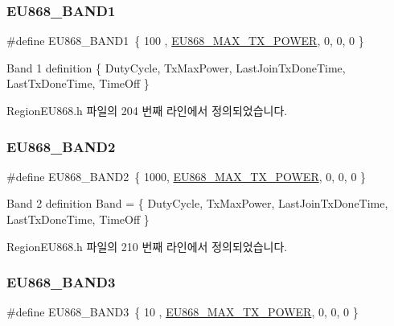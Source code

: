 \mbox{\label{group___r_e_g_i_o_n_e_u868_ga8a18e253f46e534ff0ee00c0c21b4211}} 
\subsubsection{\texorpdfstring{E\+U868\+\_\+\+B\+A\+N\+D1}{EU868\_BAND1}}
{\footnotesize\ttfamily \#define E\+U868\+\_\+\+B\+A\+N\+D1~\{ 100 , \mbox{\hyperlink{group___r_e_g_i_o_n_e_u868_ga39e338c7f8454f594302811f61d9560d}{E\+U868\+\_\+\+M\+A\+X\+\_\+\+T\+X\+\_\+\+P\+O\+W\+ER}}, 0, 0, 0 \}}

Band 1 definition \{ Duty\+Cycle, Tx\+Max\+Power, Last\+Join\+Tx\+Done\+Time, Last\+Tx\+Done\+Time, Time\+Off \} 

Region\+E\+U868.\+h 파일의 204 번째 라인에서 정의되었습니다.

\mbox{\label{group___r_e_g_i_o_n_e_u868_gaf5b8aba834ede7487acbff80b6c30b36}} 
\subsubsection{\texorpdfstring{E\+U868\+\_\+\+B\+A\+N\+D2}{EU868\_BAND2}}
{\footnotesize\ttfamily \#define E\+U868\+\_\+\+B\+A\+N\+D2~\{ 1000, \mbox{\hyperlink{group___r_e_g_i_o_n_e_u868_ga39e338c7f8454f594302811f61d9560d}{E\+U868\+\_\+\+M\+A\+X\+\_\+\+T\+X\+\_\+\+P\+O\+W\+ER}}, 0, 0, 0 \}}

Band 2 definition Band = \{ Duty\+Cycle, Tx\+Max\+Power, Last\+Join\+Tx\+Done\+Time, Last\+Tx\+Done\+Time, Time\+Off \} 

Region\+E\+U868.\+h 파일의 210 번째 라인에서 정의되었습니다.

\mbox{\label{group___r_e_g_i_o_n_e_u868_gab7e01f2131642f135babcd1189d429d3}} 
\subsubsection{\texorpdfstring{E\+U868\+\_\+\+B\+A\+N\+D3}{EU868\_BAND3}}
{\footnotesize\ttfamily \#define E\+U868\+\_\+\+B\+A\+N\+D3~\{ 10  , \mbox{\hyperlink{group___r_e_g_i_o_n_e_u868_ga39e338c7f8454f594302811f61d9560d}{E\+U868\+\_\+\+M\+A\+X\+\_\+\+T\+X\+\_\+\+P\+O\+W\+ER}}, 0, 0, 0 \}}

